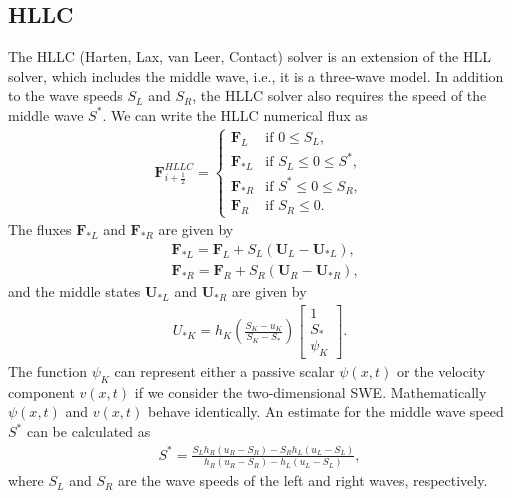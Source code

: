 \subsection{HLLC}
The HLLC (Harten, Lax, van Leer, Contact) solver is an extension of the HLL solver, which includes the middle wave, i.e., it is a three-wave model.
In addition to the wave speeds $S_L$ and $S_R$, the HLLC solver also requires the speed of the middle wave $S^*$.
We can write the HLLC numerical flux as
\begin{align*}
    \mathbf{F}_{i+\frac{1}{2}}^{HLLC} = \begin{cases}
        \mathbf{F}_L & \text{if } 0 \leq S_L, \\
        \mathbf{F}_{*L} & \text{if } S_L \leq 0 \leq S^*, \\
        \mathbf{F}_{*R} & \text{if } S^* \leq 0 \leq S_R, \\
        \mathbf{F}_R & \text{if } S_R \leq 0.
    \end{cases}
\end{align*}
The fluxes $\mathbf{F}_{*L}$ and $\mathbf{F}_{*R}$ are given by
\begin{align*}
    &\mathbf{F}_{*L} = \mathbf{F}_L + S_L (\mathbf{U}_L - \mathbf{U}_{*L}),\\
    &\mathbf{F}_{*R} = \mathbf{F}_R + S_R (\mathbf{U}_R - \mathbf{U}_{*R}),
\end{align*}
and the middle states $\mathbf{U}_{*L}$ and $\mathbf{U}_{*R}$ are given by
\begin{align*}
    U_{*K} = h_K \left( \frac{S_K - u_K}{S_K - S_*}  \right)
    \begin{bmatrix}
        1 \\ S_* \\ \psi_K
    \end{bmatrix}.
\end{align*}
The function $\psi_K$ can represent either a passive scalar $\psi(x,t)$ or the velocity component $v(x,t)$ if we consider the two-dimensional SWE.
Mathematically $\psi(x,t)$ and $v(x,t)$ behave identically.
An estimate for the middle wave speed $S^*$ can be calculated as
\begin{align*}
    S^* = \frac{S_L h_R(u_R - S_R) - S_R h_L (u_L - S_L)}{h_R (u_R - S_R) - h_L (u_L - S_L)},
\end{align*}
where $S_L$ and $S_R$ are the wave speeds of the left and right waves, respectively.

